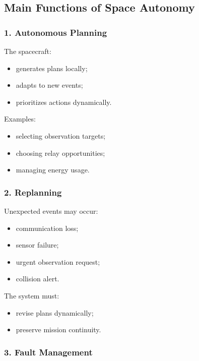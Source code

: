 \documentclass[10pt,a4paper,twocolumn]{article}
\begin{document}
\subsection{Main Functions of Space Autonomy}


\subsubsection*{1. Autonomous Planning}

The spacecraft:
\begin{itemize}
    \item generates plans locally;
    \item adapts to new events;
    \item prioritizes actions dynamically.
\end{itemize}

Examples:
\begin{itemize}
    \item selecting observation targets;
    \item choosing relay opportunities;
    \item managing energy usage.
\end{itemize}


\subsubsection*{2. Replanning}

Unexpected events may occur:
\begin{itemize}
    \item communication loss;
    \item sensor failure;
    \item urgent observation request;
    \item collision alert.
\end{itemize}

The system must:
\begin{itemize}
    \item revise plans dynamically;
    \item preserve mission continuity.
\end{itemize}


\subsubsection*{3. Fault Management}
\end{document}
